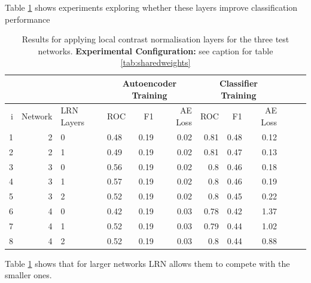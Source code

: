       Table \ref{tab:lrn} shows experiments exploring whether these layers improve
      classification performance
      \begin{table}[!h] \centering
      {\small
      \begin{tabular}{rrllrrrrrrrr}
        &&&   \multicolumn{3}{|c|}{Autoencoder Training} &  \multicolumn{3}{c|}{Classifier Training}    \\
      \hline
        i & Network             & LRN Layers   &    ROC&F1&AE Loss & ROC & F1 & AE Loss \\
      \hline
       1 & 2 & 0  &    0.48 &   0.19 &     0.02 &    0.81 &   0.48 &     0.12 \\
       2 & 2 & 1  &    0.49 &   0.19 &     0.02 &    0.81 &   0.47 &     0.13 \\
      \hline
       3 & 3 & 0  &    0.56 &   0.19 &     0.02 &    0.8  &   0.46 &     0.18 \\
       4 & 3 & 1  &    0.57 &   0.19 &     0.02 &    0.8  &   0.46 &     0.19 \\
       5 & 3 & 2  &    0.52 &   0.19 &     0.02 &    0.8  &   0.45 &     0.22 \\
      \hline
       6 & 4 & 0  &    0.42 &   0.19 &     0.03 &    0.78 &   0.42 &     1.37 \\
       7 & 4 & 1  &    0.52 &   0.19 &     0.03 &    0.79 &   0.44 &     1.02 \\
       8 & 4 & 2  &    0.52 &   0.19 &     0.03 &    0.8  &   0.44 &     0.88 \\
      \hline
      \end{tabular}}\caption{Results for applying local contrast normalisation layers
      for the three test networks. {\bf Experimental Configuration:} see caption
      for table \ref{tab:sharedweights}}\label{tab:lrn}  \end{table}

      Table \ref{tab:lrn} shows that for larger networks LRN allows them to compete with
      the smaller ones.

      \newpage
